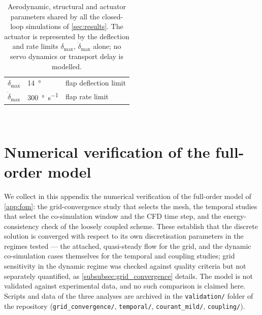 \begin{table}[t]
\begin{tabular}{|p{}|p{}|p{}|}
    $\delta_{\max}$ & \SI{14}{\degree} & flap deflection limit \T\B \\
    $\dot\delta_{\max}$ & \SI{300}{\degree\per\second} & flap rate limit \B \\
    \hline
    \end{tabular}
    \\[6pt]
    \caption{Aerodynamic, structural and actuator parameters shared by all the closed-loop
    simulations of \cref{sec:results}. The actuator is represented by the deflection and
    rate limits $\delta_{\max}$, $\dot\delta_{\max}$ alone; no servo dynamics or transport
    delay is modelled.}
    \label{tab:results_setup}
\end{table}


\section{Numerical verification of the full-order model}
\label{app:vv}

We collect in this appendix the numerical verification of the full-order model of \cref{app:fom}: the grid-convergence study that selects the mesh, the temporal studies that select the co-simulation window and the CFD time step, and the energy-consistency check of the loosely coupled scheme. These establish that the discrete solution is converged with respect to its own discretisation parameters in the regimes tested --- the attached, quasi-steady flow for the grid, and the dynamic co-simulation cases themselves for the temporal and coupling studies; grid sensitivity in the dynamic regime was checked against quality criteria but not separately quantified, as \cref{subsubsec:grid_convergence} details. The model is not validated against experimental data, and no such comparison is claimed here. Scripts and data of the three analyses are archived in the \texttt{validation/} folder of the repository (\texttt{grid\_convergence/}, \texttt{temporal/}, \texttt{courant\_mild/}, \texttt{coupling/}).


